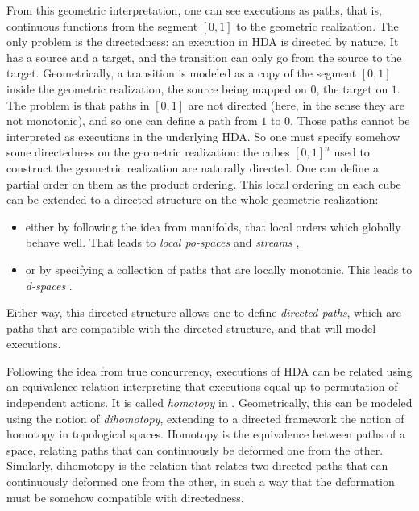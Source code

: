 From this geometric interpretation, one can see executions as paths, that is, continuous functions from the segment $[0,1]$ to the geometric realization. The only problem is the directedness: an execution in HDA is directed by nature. It has a source and a target, and the transition can only go from the source to the target. Geometrically, a transition is modeled as a copy of the segment $[0,1]$ inside the geometric realization, the source being mapped on $0$, the target on $1$. The problem is that paths in $[0,1]$ are not directed (here, in the sense they are not monotonic), and so one can define a path from $1$ to $0$. Those paths cannot be interpreted as executions in the underlying HDA. So one must specify somehow some directedness on the geometric realization: the cubes $[0,1]^n$ used to construct the geometric realization are naturally directed. One can define a partial order on them as the product ordering. This local ordering on each cube can be extended to a directed structure on the whole geometric realization:
\begin{itemize}
	\item either by following the idea from manifolds, that local orders which globally behave well. That leads to \emph{local po-spaces} \cite{fajstrup03} and \emph{streams} \cite{krishnan09},
	\item or by specifying a collection of paths that are locally monotonic. This leads to \emph{d-spaces} \cite{grandis01}.
\end{itemize}
Either way, this directed structure allows one to define \emph{directed paths}, which are paths that are compatible with the directed structure, and that will model executions.

Following the idea from true concurrency, executions of HDA can be related using an equivalence relation interpreting that executions equal up to permutation of independent actions. It is called \emph{homotopy} in \cite{vanglabbeek05}. Geometrically, this can be modeled using the notion of \emph{dihomotopy}, extending to a directed framework the notion of homotopy in topological spaces. Homotopy is the equivalence between paths of a space, relating paths that can continuously be deformed one from the other. Similarly, dihomotopy is the relation that relates two directed paths that can continuously deformed one from the other, in such a way that the deformation must be somehow compatible with directedness.



